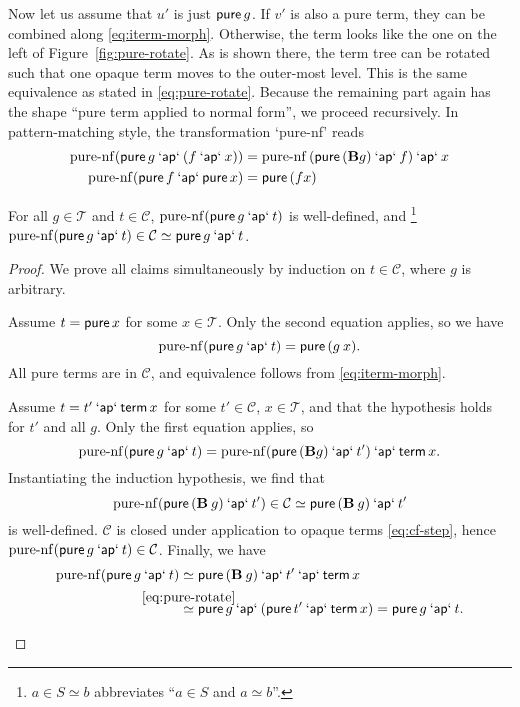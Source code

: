 Now let us assume that $u'$ is just $\operatorname{\mathsf{pure}} g$.
If $v'$ is also a pure term, they can be combined along \eqref{eq:iterm-morph}.
Otherwise, the term looks like the one on the left of Figure~\ref{fig:pure-rotate}.
As is shown there, the term tree can be rotated such that one opaque term moves
to the outer-most level.
This is the same equivalence as stated in \eqref{eq:pure-rotate}.
Because the remaining part again has the shape ``pure term applied to normal
form'', we proceed recursively.
In pattern-matching style, the transformation `pure-nf' reads
\begin{align}
	\operatorname{pure-nf}(\operatorname{\mathsf{pure}} g \mathbin{\mathsf{`ap`}} (f \mathbin{\mathsf{`ap`}} x)) &=
		\operatorname{pure-nf}{(\operatorname{\mathsf{pure}}{(\mathbf{B} g)} \mathbin{\mathsf{`ap`}} f)} \mathbin{\mathsf{`ap`}} x \\
	\operatorname{pure-nf}(\operatorname{\mathsf{pure}} f \mathbin{\mathsf{`ap`}} \operatorname{\mathsf{pure}} x) &= \operatorname{\mathsf{pure}}{(f x)}
\end{align}
\begin{lemma}\label{thm:pure-nf}
For all $g \in \mathcal{T}$ and $t \in \mathcal{C}$,
$\operatorname{pure-nf}(\operatorname{\mathsf{pure}} g \mathbin{\mathsf{`ap`}} t)$ is well-defined, and%
\/\footnote{$a \in S \simeq b$ abbreviates ``$a \in S$ and $a \simeq b$''.}
$\operatorname{pure-nf}(\operatorname{\mathsf{pure}} g \mathbin{\mathsf{`ap`}} t) \in \mathcal{C} \simeq \operatorname{\mathsf{pure}} g \mathbin{\mathsf{`ap`}} t$.
\end{lemma}
\begin{proof}
We prove all claims simultaneously by induction on $t \in \mathcal{C}$,
where $g$ is arbitrary.
\begin{prfcases}
\item Assume $t = \operatorname{\mathsf{pure}} x$ for some $x \in \mathcal{T}$.
	Only the second equation applies, so we have
	\[ \operatorname{pure-nf}(\operatorname{\mathsf{pure}} g \mathbin{\mathsf{`ap`}} t) = \operatorname{\mathsf{pure}}{(g \> x)}. \]
	All pure terms are in $\mathcal{C}$, and equivalence follows from
	\eqref{eq:iterm-morph}.
\item Assume $t = t' \mathbin{\mathsf{`ap`}} \operatorname{\mathsf{term}} x$ for some
	$t' \in \mathcal{C}$, $x \in \mathcal{T}$, and that the hypothesis holds
	for $t'$ and all $g$.
	Only the first equation applies, so
	\[ \operatorname{pure-nf}(\operatorname{\mathsf{pure}} g \mathbin{\mathsf{`ap`}} t) =
		\operatorname{pure-nf}(\operatorname{\mathsf{pure}}{(\mathbf{B} g)} \mathbin{\mathsf{`ap`}} t') \mathbin{\mathsf{`ap`}} \operatorname{\mathsf{term}} x. \]
	Instantiating the induction hypothesis, we find that
	\[ \operatorname{pure-nf}(\operatorname{\mathsf{pure}}{(\mathbf{B} \> g)} \mathbin{\mathsf{`ap`}} t') \in \mathcal{C} \simeq
		\operatorname{\mathsf{pure}}{(\mathbf{B} \> g)} \mathbin{\mathsf{`ap`}} t' \]
	is well-defined.
	$\mathcal{C}$ is closed under application to opaque terms \eqref{eq:cf-step},
	hence $\operatorname{pure-nf}(\operatorname{\mathsf{pure}} g \mathbin{\mathsf{`ap`}} t) \in \mathcal{C}$.
	Finally, we have
	\begin{align*}
		\operatorname{pure-nf}(\spure g \sap t) &\simeq
			\spure{(\mathbf{B} \sapp g)} \sap t' \sap \sterm x \\
		&\stackrel{\mathclap{\eqref{eq:pure-rotate}}}{\simeq}
			\spure g \sap (\spure t' \sap \sterm x) =
			\spure g \sap t. \qedhere
	\end{align*}
\end{prfcases}
\end{proof}

